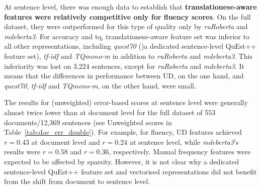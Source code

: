 At sentence level, there was enough data to establish that \textbf{translationese-aware features were relatively competitive only for fluency scores}. On the full dataset, they were outperformed for this type of quality only by \textit{ruRoberta} and \textit{mdeberta3}. For accuracy and tq, translationese-aware feature set was inferior to all other representations, including \textit{quest70} ()a dedicated sentence-level QuEst++ feature set), \textit{tf-idf} and \textit{TQmono-m} in addition to \textit{ruRoberta} and \textit{mdeberta3}. This inferiority was lost on 3,224 sentences, except for \textit{ruRoberta} and \textit{mdeberta3}. It means that the differences in performance between UD, on the one hand, and \textit{quest70}, \textit{tf-idf} and \textit{TQmono-m}, on the other hand, were small. 

\label{pg:downward_slide}
The results for (unweighted) error-based scores at sentence level were generally almost twice lower than at document level for the full dataset of 553 documents/12,369 sentences (see Unweighted scores in Table~\ref{tab:doc_err_double}). For example, for fluency, UD features achieved $r=0.43$ at document level and $r=0.24$ at sentence level, while \textit{mdeberta3}'s results were $r=0.58$ and $r=0.36$, respectively. Manual frequency features were expected to be affected by sparsity. However, it is not clear why a dedicated sentence-level QuEst++ feature set and vectorised representations did not benefit from the shift from document to sentence level.

